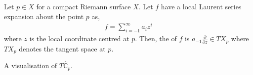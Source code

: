 \begin{definition}
	Let $ p \in X $ for a compact Riemann surface $ X $. Let $ f $ have a local
	Laurent series expansion about the point $ p $ as,
	\begin{align*}
		f = \sum_{i=-1}^{\infty}{a_{i}z^{i}}
	\end{align*}
	where $ z $ is the local coordinate centred at $ p $. Then, the
	 of $ f $ is $ a_{-1}\frac{\partial }{\partial z} \in
		TX_{p} $ where $ TX_{p} $ denotes the tangent space at $ p $.
\end{definition}

\begin{marginfigure}
	\centering
	\caption{A visualisation of $ T \hat{\mathbb{C}}_{p} $.}
\end{marginfigure}

